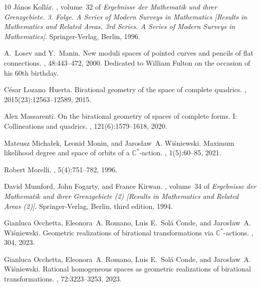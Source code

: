 \begin{thebibliography}{10}
J{\'a}nos Koll{\'a}r.
, volume~32 of {\em
  Ergebnisse der Mathematik und ihrer Grenzgebiete. 3. Folge. A Series of
  Modern Surveys in Mathematics [Results in Mathematics and Related Areas. 3rd
  Series. A Series of Modern Surveys in Mathematics]}.
\newblock Springer-Verlag, Berlin, 1996.

A.~Losev and Y.~Manin.
\newblock New moduli spaces of pointed curves and pencils of flat connections.
, 48:443--472, 2000.
\newblock Dedicated to William Fulton on the occasion of his 60th birthday.

C{\'e}sar Lozano~Huerta.
\newblock Birational geometry of the space of complete quadrics.
, 2015(23):12563--12589, 2015.

Alex Massarenti.
\newblock On the birational geometry of spaces of complete forms. {I}:
  {Collineations} and quadrics.
, 121(6):1579--1618, 2020.

Mateusz Micha{\l}ek, Leonid Monin, and Jaros{\l}aw~A. Wi\'sniewski.
\newblock Maximum likelihood degree and space of orbits of a
  $\mathbb{C}^*$-action.
, 1(5):60--85, 2021.

Robert {Morelli}.
, 5(4):751--782, 1996.

David Mumford, John Fogarty, and France Kirwan.
, volume~34 of {\em Ergebnisse der
  Mathematik und ihrer Grenzgebiete (2) [Results in Mathematics and Related
  Areas (2)]}.
\newblock Springer-Verlag, Berlin, third edition, 1994.

Gianluca Occhetta, Eleonora~A. Romano, Luis E.~Sol\'a Conde, and Jaros{\l}aw~A.
  Wi{\'s}niewski.
\newblock Geometric realizations of birational transformations via
  $\mathbb{C}^*$-actions.
, 304, 2023.

Gianluca Occhetta, Eleonora~A. Romano, Luis E.~Sol\'a Conde, and Jaros{\l}aw~A.
  Wi{\'s}niewski.
\newblock Rational homogeneous spaces as geometric realizations of birational
  transformations.
, 72:3223--3253, 2023.


\end{thebibliography}
